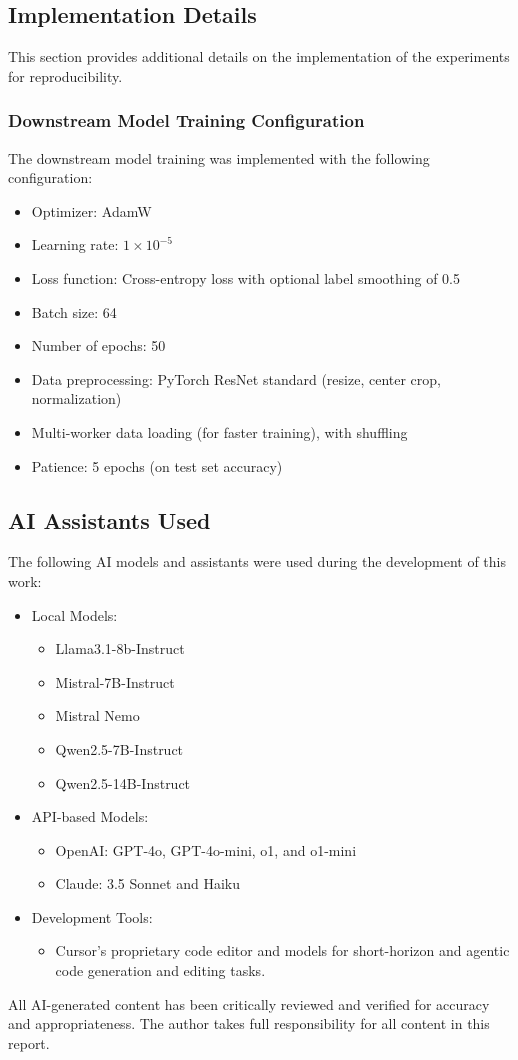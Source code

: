 \documentclass[../ShajiS_RnDReport.tex]{subfiles}
\begin{document}
\subsection{Implementation Details}
\label{sec:appendix:implementation}
This section provides additional details on the implementation of the experiments for reproducibility.

\subsubsection*{Downstream Model Training Configuration}
The downstream model training was implemented with the following configuration:
\begin{itemize}
    \item Optimizer: AdamW
    \item Learning rate: \(1 \times 10^{-5}\)
    \item Loss function: Cross-entropy loss with optional label smoothing of 0.5
    \item Batch size: 64
    \item Number of epochs: 50
    \item Data preprocessing: PyTorch ResNet standard (resize, center crop, normalization)
    \item Multi-worker data loading (for faster training), with shuffling
    \item Patience: 5 epochs (on test set accuracy)
\end{itemize}

\subsection{AI Assistants Used}
\label{sec:appendix:ai-assistants}
The following AI models and assistants were used during the development of this work:

\begin{itemize}
\item Local Models:
\begin{itemize}
    \item Llama3.1-8b-Instruct
    \item Mistral-7B-Instruct
    \item Mistral Nemo
    \item Qwen2.5-7B-Instruct
    \item Qwen2.5-14B-Instruct
\end{itemize}

\item API-based Models:
\begin{itemize}
    \item OpenAI: GPT-4o, GPT-4o-mini, o1, and o1-mini
    \item Claude: 3.5 Sonnet and Haiku
\end{itemize}

\item Development Tools:
\begin{itemize}
    \item Cursor's proprietary code editor and models for short-horizon and agentic code generation and editing tasks.
\end{itemize}
\end{itemize}

All AI-generated content has been critically reviewed and verified for accuracy and appropriateness. The author takes full responsibility for all content in this report.
\end{document}
